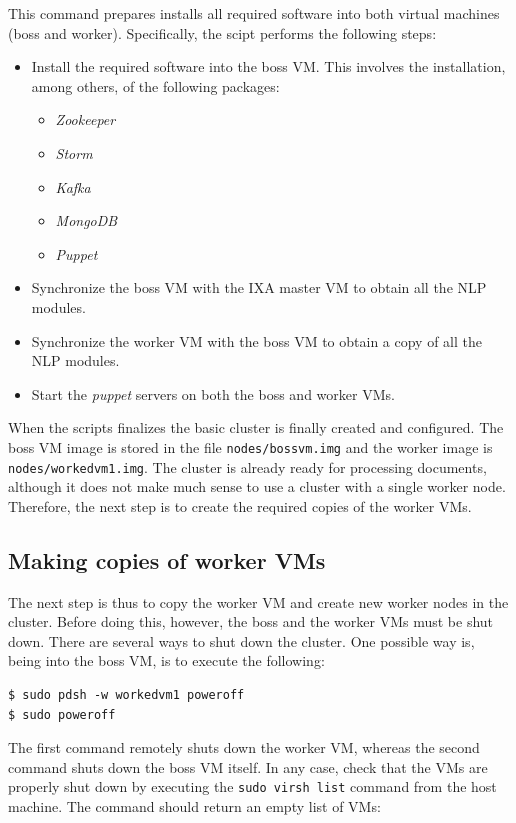 \documentclass[a4]{article}
\begin{document}
This command prepares installs all required software into both virtual
machines (boss and worker). Specifically, the scipt performs the following steps:
\begin{itemize}
\item Install the required software into the boss VM. This involves the
  installation, among others, of the following packages:
  \begin{itemize}
  \item \emph{Zookeeper}
  \item \emph{Storm}
  \item \emph{Kafka}
  \item \emph{MongoDB}
  \item \emph{Puppet}
  \end{itemize}
\item Synchronize the boss VM with the IXA master VM to obtain all the NLP
  modules.
\item Synchronize the worker VM with the boss VM to obtain a copy of all the
  NLP modules.
\item Start the \emph{puppet} servers on both the boss and worker VMs.
\end{itemize}

When the scripts finalizes the basic cluster is finally created and
configured. The boss VM image is stored in the file
\texttt{nodes/bossvm.img} and the worker image is
\texttt{nodes/workedvm1.img}. The cluster is already ready for processing
documents, although it does not make much sense to use a cluster with a
single worker node. Therefore, the next step is to create the required
copies of the worker VMs.

\subsection{Making copies of worker VMs}
\label{sec:making-copies-worker}

The next step is thus to copy the worker VM and create new worker nodes in
the cluster. Before doing this, however, the boss and the worker VMs must be
shut down. There are several ways to shut down the cluster. One possible way
is, being into the boss VM, is to execute the following:

\begin{verbatim}
$ sudo pdsh -w workedvm1 poweroff
$ sudo poweroff
\end{verbatim}

The first command remotely shuts down the worker VM, whereas the second
command shuts down the boss VM itself. In any case, check that the VMs are
properly shut down by executing the \texttt{sudo virsh list} command from
the host machine. The command should return an empty list of VMs:
\end{document}
